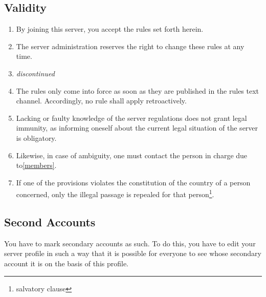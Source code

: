 \documentclass{article}
\begin{document}
\subsection{Validity}
\begin{enumerate}[(1)]
	\item By joining this server, you accept the rules set forth herein.
	\item The server administration reserves the right to change these rules at any time.
	\item \textit{discontinued}
	\item The rules only come into force as soon as they are published in the rules text channel. Accordingly, no rule shall apply retroactively.
	\item Lacking or faulty knowledge of the server regulations does not grant legal immunity, as informing oneself about the current legal situation of the server is obligatory.
	\item Likewise, in case of ambiguity, one must contact the person in charge due to\ref{members}.
	\item If one of the provisions violates the constitution of the country of a person concerned, only the illegal passage is repealed for that person\footnote{salvatory clause}.	
\end{enumerate}

\subsection{Second Accounts}
You have to mark secondary accounts as such. To do this, you have to edit your server profile in such a way that it is possible for everyone to see whose secondary account it is on the basis of this profile.
\end{document}
